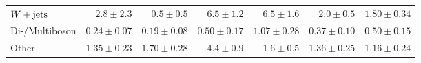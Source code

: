 \begin{table}
\begin{center}
{\begin{tabular}{lrrrrrr}
        $W+\mathrm{jets}$        & $2.8 \pm 2.3$          & $0.5 \pm 0.5$          & $6.5 \pm 1.2$    & $6.5 \pm 1.6$          & $2.0 \pm 0.5$          & $1.80 \pm 0.34$              \\
        Di-/Multiboson       & $0.24 \pm 0.07$          & $0.19 \pm 0.08$          & $0.50 \pm 0.17$     & $1.07 \pm 0.28$          & $0.37 \pm 0.10$          & $0.50 \pm 0.15$              \\
        Other       & $1.35 \pm 0.23$          & $1.70 \pm 0.28$          & $4.4 \pm 0.9$    & $1.6 \pm 0.5$          & $1.36 \pm 0.25$          & $1.16 \pm 0.24$              \\
\bottomrule
\end{tabular}
}
\end{center}
\caption{}
\label{tab:results_bkg_only_VR}
\end{table}
%